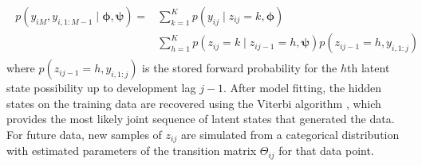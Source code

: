 \begin{align}
    \begin{split}
        p(y_{iM}, y_{i,1:M-1} \mid \bm{\phi}, \bm{\psi}) =
        &\sum_{k=1}^{K} p(y_{ij} \mid z_{ij} = k, \bm{\phi})\\
        &\sum_{h=1}^{K} p(z_{ij} = k \mid z_{ij-1} = h, \bm{\psi})
            p(z_{ij - 1} = h, y_{i, 1:j})
    \end{split}
\end{align}
%
where $p(z_{ij-1} = h, y_{i,1:j})$ is the stored
forward probability for the $h$th latent state possibility
up to development lag $j - 1$.
After model fitting, the hidden states on the
training data are recovered using the
Viterbi algorithm \citep{rabiner1989},
which provides the most likely joint
sequence of latent states that generated
the data. For future data, new samples of
$z_{ij}$ are simulated from a categorical
distribution with estimated parameters of
the transition matrix $\Theta_{ij}$ for
that data point.
